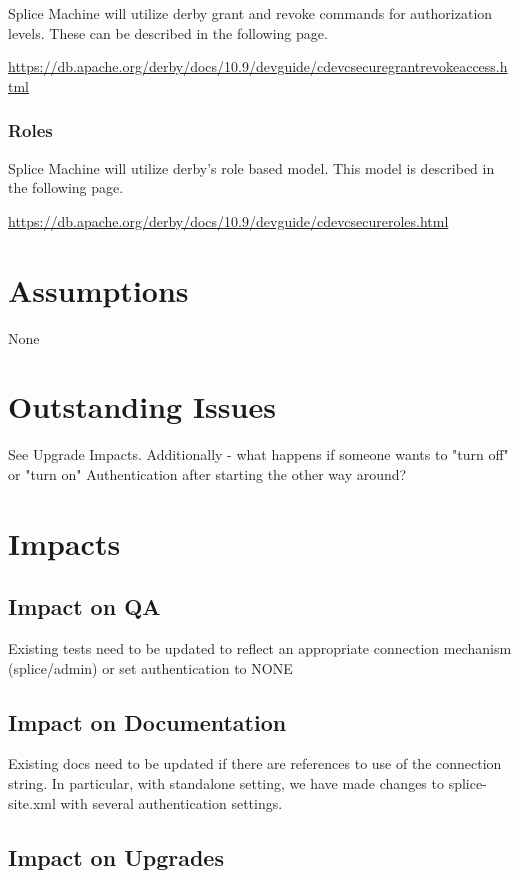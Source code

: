 \documentclass{article}
\begin{document}
Splice Machine will utilize derby grant and revoke commands for
authorization levels.  These can be described in the following page.

\url{https://db.apache.org/derby/docs/10.9/devguide/cdevcsecuregrantrevokeaccess.html}

\subsubsection{Roles}

Splice Machine will utilize derby's role based model.  This model is described
in the following page.

\url{https://db.apache.org/derby/docs/10.9/devguide/cdevcsecureroles.html}


\section{Assumptions}

None

\section{Outstanding Issues}

See Upgrade Impacts.  Additionally - what happens if someone wants to "turn off" or "turn on" Authentication after starting the other way around?

\section{Impacts}

\subsection{Impact on QA}

Existing tests need to be updated to reflect an appropriate connection mechanism (splice/admin) or set authentication to NONE

\subsection{Impact on Documentation} 

Existing docs need to be updated if there are references to use of the connection string. In particular, with standalone setting, we have made changes 
to splice-site.xml with several authentication settings. 

\subsection{Impact on Upgrades}
\end{document}
